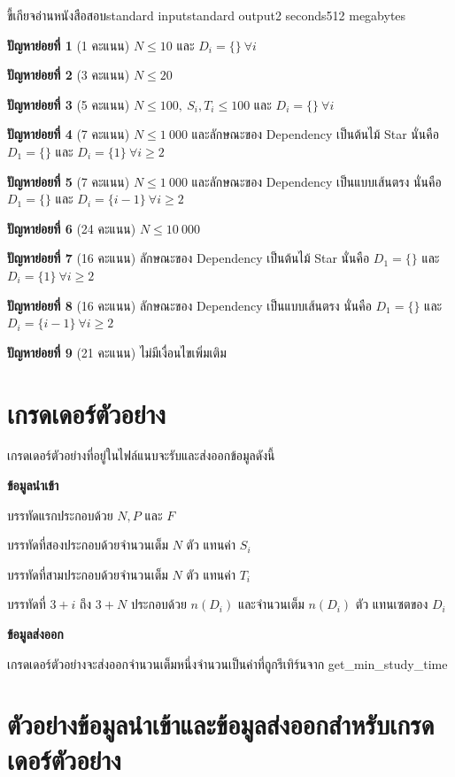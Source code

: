 \documentclass[11pt,a4paper]{article}
\begin{document}
\begin{problem}{ขี้เกียจอ่านหนังสือสอบ}{standard input}{standard output}{2 seconds}{512 megabytes}
\Subtasks

\textbf{ปัญหาย่อยที่ 1} (1 คะแนน) $N \le 10$ และ $D_i = \{\}\ \forall i$

\textbf{ปัญหาย่อยที่ 2} (3 คะแนน) $N \le 20$

\textbf{ปัญหาย่อยที่ 3} (5 คะแนน) $N \le 100,\ S_i, T_i \le 100$ และ $D_i = \{\}\ \forall i$

\textbf{ปัญหาย่อยที่ 4} (7 คะแนน) $N \le 1\ 000$ และลักษณะของ Dependency เป็นต้นไม้ Star นั่นคือ $D_1 = \{\}$ และ $D_i = \{1\}\ \forall i \ge 2$

\textbf{ปัญหาย่อยที่ 5} (7 คะแนน) $N \le 1\ 000$ และลักษณะของ Dependency เป็นแบบเส้นตรง นั่นคือ $D_1 = \{\}$ และ $D_i = \{i-1\}\ \forall i \ge 2$

\textbf{ปัญหาย่อยที่ 6} (24 คะแนน) $N \le 10\ 000$

\textbf{ปัญหาย่อยที่ 7} (16 คะแนน) ลักษณะของ Dependency เป็นต้นไม้ Star นั่นคือ $D_1 = \{\}$ และ $D_i = \{1\}\ \forall i \ge 2$

\textbf{ปัญหาย่อยที่ 8} (16 คะแนน) ลักษณะของ Dependency เป็นแบบเส้นตรง นั่นคือ $D_1 = \{\}$ และ $D_i = \{i-1\}\ \forall i \ge 2$

\textbf{ปัญหาย่อยที่ 9} (21 คะแนน) ไม่มีเงื่อนไขเพิ่มเติม

\section*{เกรดเดอร์ตัวอย่าง}

เกรดเดอร์ตัวอย่างที่อยู่ในไฟล์แนบจะรับและส่งออกข้อมูลดังนี้

\textbf{ข้อมูลนำเข้า}

บรรทัดแรกประกอบด้วย $N, P$ และ $F$

บรรทัดที่สองประกอบด้วยจำนวนเต็ม $N$ ตัว แทนค่า $S_i$

บรรทัดที่สามประกอบด้วยจำนวนเต็ม $N$ ตัว แทนค่า $T_i$

บรรทัดที่ $3+i$ ถึง $3+N$ ประกอบด้วย $n(D_i)$ และจำนวนเต็ม $n(D_i)$ ตัว แทนเซตของ $D_i$

\textbf{ข้อมูลส่งออก}

เกรดเดอร์ตัวอย่างจะส่งออกจำนวนเต็มหนึ่งจำนวนเป็นค่าที่ถูกรีเทิร์นจาก get\_min\_study\_time

\section*{ตัวอย่างข้อมูลนำเข้าและข้อมูลส่งออกสำหรับเกรดเดอร์ตัวอย่าง}

\begin{example}
%
\end{example}

\end{problem}
\end{document}
